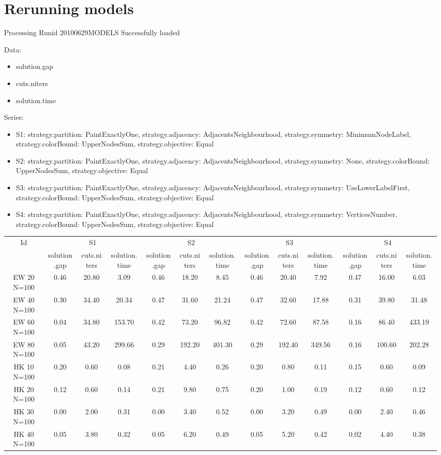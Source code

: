 \documentclass[landscape, 12pt]{report}
\begin{document}
\section{Rerunning models}


Processing Runid 20100629MODELS
 Successfully loaded
 
 
Data:
\begin{itemize}
\item solution.gap
\item cuts.niters
\item solution.time
\end{itemize}
Series:
\begin{itemize}
\item S1: strategy.partition: PaintExactlyOne, strategy.adjacency: AdjacentsNeighbourhood, strategy.symmetry: MinimumNodeLabel, strategy.colorBound: UpperNodesSum, strategy.objective: Equal
\item S2: strategy.partition: PaintExactlyOne, strategy.adjacency: AdjacentsNeighbourhood, strategy.symmetry: None, strategy.colorBound: UpperNodesSum, strategy.objective: Equal
\item S3: strategy.partition: PaintExactlyOne, strategy.adjacency: AdjacentsNeighbourhood, strategy.symmetry: UseLowerLabelFirst, strategy.colorBound: UpperNodesSum, strategy.objective: Equal
\item S4: strategy.partition: PaintExactlyOne, strategy.adjacency: AdjacentsNeighbourhood, strategy.symmetry: VerticesNumber, strategy.colorBound: UpperNodesSum, strategy.objective: Equal
\end{itemize}
\begin{tabular}{|c|ccc|ccc|ccc|ccc|}
\hline
\multicolumn{1}{|c|}{Id} & \multicolumn{3}{|c|}{S1} & \multicolumn{3}{|c|}{S2} & \multicolumn{3}{|c|}{S3} & \multicolumn{3}{|c|}{S4}
\\
 & solution.gap & cuts.niters & solution.time & solution.gap & cuts.niters & solution.time & solution.gap & cuts.niters & solution.time & solution.gap & cuts.niters & solution.time
\\
\hline
EW 20 N=100 & 0.46 & 20.80 & 3.09 & 0.46 & 18.20 & 8.45 & 0.46 & 20.40 & 7.92 & 0.47 & 16.00 & 6.03
\\
EW 40 N=100 & 0.30 & 34.40 & 20.34 & 0.47 & 31.60 & 21.24 & 0.47 & 32.60 & 17.88 & 0.31 & 39.80 & 31.48
\\
EW 60 N=100 & 0.04 & 34.80 & 153.70 & 0.42 & 73.20 & 96.82 & 0.42 & 72.60 & 87.58 & 0.16 & 86.40 & 433.19
\\
EW 80 N=100 & 0.05 & 43.20 & 299.66 & 0.29 & 192.20 & 401.30 & 0.29 & 192.40 & 349.56 & 0.16 & 100.60 & 202.28
\\
HK 10 N=100 & 0.20 & 0.60 & 0.08 & 0.21 & 4.40 & 0.26 & 0.20 & 0.80 & 0.11 & 0.15 & 0.60 & 0.09
\\
HK 20 N=100 & 0.12 & 0.60 & 0.14 & 0.21 & 9.80 & 0.75 & 0.20 & 1.00 & 0.19 & 0.12 & 0.60 & 0.12
\\
HK 30 N=100 & 0.00 & 2.00 & 0.31 & 0.00 & 3.40 & 0.52 & 0.00 & 3.20 & 0.49 & 0.00 & 2.40 & 0.46
\\
HK 40 N=100 & 0.05 & 3.80 & 0.32 & 0.05 & 6.20 & 0.49 & 0.05 & 5.20 & 0.42 & 0.02 & 4.40 & 0.38
\\
\hline 
 \end{tabular}
 
\end{document}
